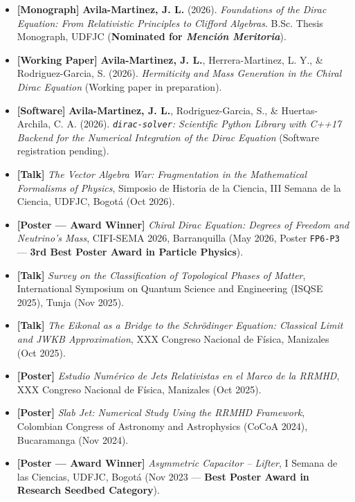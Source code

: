 \documentclass[10pt,a4paper]{article}
\begin{document}
\begin{itemize}
  \item \textbf{[Monograph]} \textbf{Avila-Martinez, J. L.} (2026). \textit{Foundations of the Dirac Equation: From Relativistic Principles to Clifford Algebras}. B.Sc. Thesis Monograph, UDFJC (\textbf{Nominated for \textit{Menci\'on Meritoria}}).
  \item \textbf{[Working Paper]} \textbf{Avila-Martinez, J. L.}, Herrera-Martinez, L. Y., \& Rodriguez-Garcia, S. (2026). \textit{Hermiticity and Mass Generation in the Chiral Dirac Equation} (Working paper in preparation).
  \item \textbf{[Software]} \textbf{Avila-Martinez, J. L.}, Rodriguez-Garcia, S., \& Huertas-Archila, C. A. (2026). \textit{\texttt{dirac-solver}: Scientific Python Library with C++17 Backend for the Numerical Integration of the Dirac Equation} (Software registration pending).
  \item \textbf{[Talk]} \textit{The Vector Algebra War: Fragmentation in the Mathematical Formalisms of Physics}, Simposio de Historia de la Ciencia, III Semana de la Ciencia, UDFJC, Bogot\'a (Oct 2026).
  \item \textbf{[Poster --- Award Winner]} \textit{Chiral Dirac Equation: Degrees of Freedom and Neutrino's Mass}, CIFI-SEMA 2026, Barranquilla (May 2026, Poster \texttt{FP6-P3} --- \textbf{3rd Best Poster Award in Particle Physics}).
  \item \textbf{[Talk]} \textit{Survey on the Classification of Topological Phases of Matter}, International Symposium on Quantum Science and Engineering (ISQSE 2025), Tunja (Nov 2025).
  \item \textbf{[Talk]} \textit{The Eikonal as a Bridge to the Schr\"odinger Equation: Classical Limit and JWKB Approximation}, XXX Congreso Nacional de F\'isica, Manizales (Oct 2025).
  \item \textbf{[Poster]} \textit{Estudio Num\'erico de Jets Relativistas en el Marco de la RRMHD}, XXX Congreso Nacional de F\'isica, Manizales (Oct 2025).
  \item \textbf{[Poster]} \textit{Slab Jet: Numerical Study Using the RRMHD Framework}, Colombian Congress of Astronomy and Astrophysics (CoCoA 2024), Bucaramanga (Nov 2024).
  \item \textbf{[Poster --- Award Winner]} \textit{Asymmetric Capacitor -- Lifter}, I Semana de las Ciencias, UDFJC, Bogot\'a (Nov 2023 --- \textbf{Best Poster Award in Research Seedbed Category}).
\end{itemize}
\end{document}
